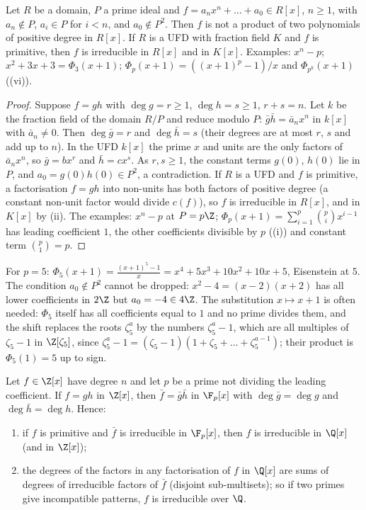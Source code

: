 \begin{theorem}\label{thm:rings:eisenstein}
Let $R$ be a domain, $P$ a prime ideal and $f=a_nx^n+\dots+a_0\in R[x]$, $n\ge1$, with $a_n\notin P$, $a_i\in P$ for $i<n$, and $a_0\notin P^2$. Then $f$ is
not a product of two polynomials of positive degree in $R[x]$. If $R$ is a UFD with fraction field $K$ and $f$ is primitive, then $f$
is irreducible in $R[x]$ and in $K[x]$. Examples: $x^n-p$; $x^2+3x+3=\Phi_3(x+1)$; $\Phi_p(x+1)=((x+1)^p-1)/x$ and $\Phi_{p^k}(x+1)$
((vi)).
\end{theorem}

\begin{proof}
Suppose $f=gh$ with $\deg g=r\ge1$, $\deg h=s\ge1$, $r+s=n$. Let $k$ be the fraction field of the domain $R/P$ and reduce modulo $P$:
$\bar g\bar h=\bar a_nx^n$ in $k[x]$ with $\bar a_n\ne0$. Then $\deg\bar g=r$ and $\deg\bar h=s$ (their degrees are at most $r$, $s$ and add up to $n$). In
the UFD $k[x]$ the prime $x$ and units are the only factors of $\bar a_nx^n$, so $\bar g=bx^r$ and $\bar h=cx^s$. As $r,s\ge1$, the constant terms
$g(0)$, $h(0)$ lie in $P$, and $a_0=g(0)h(0)\in P^2$, a contradiction. If $R$ is a UFD and $f$ is primitive, a factorisation $f=gh$ into non-units
has both factors of positive degree (a constant non-unit factor would divide $c(f)$), so $f$ is irreducible in $R[x]$, and in $K[x]$
by (ii). The examples: $x^n-p$ at $P=p\Z$; $\Phi_p(x+1)=\sum_{i=1}^p\binom pix^{i-1}$ has leading coefficient $1$,
the other coefficients divisible by $p$ ((i)) and constant term $\binom p1=p$.
\end{proof}

For $p=5$: $\Phi_5(x+1)=\frac{(x+1)^5-1}x=x^4+5x^3+10x^2+10x+5$, Eisenstein at $5$. The condition $a_0\notin P^2$ cannot be dropped:
$x^2-4=(x-2)(x+2)$ has all lower coefficients in $2\Z$ but $a_0=-4\in4\Z$. The substitution $x\mapsto x+1$ is often needed: $\Phi_5$ itself
has all coefficients equal to $1$ and no prime divides them, and the shift replaces the roots $\zeta_5^a$ by the numbers $\zeta_5^a-1$, which are all
multiples of $\zeta_5-1$ in $\Z[\zeta_5]$, since $\zeta_5^a-1=(\zeta_5-1)(1+\zeta_5+\dots+\zeta_5^{a-1})$; their product is $\Phi_5(1)=5$ up to sign.

\begin{proposition}\label{prop:rings:reduction-mod-p}
Let $f\in\Z[x]$ have degree $n$ and let $p$ be a prime not dividing the leading coefficient. If $f=gh$ in $\Z[x]$, then $\bar f=\bar g\bar h$ in $\F_p[x]$
with $\deg\bar g=\deg g$ and $\deg\bar h=\deg h$. Hence:
\begin{enumerate}[label=(\roman*)]
\item if $f$ is primitive and $\bar f$ is irreducible in $\F_p[x]$, then $f$ is irreducible in $\Q[x]$ (and in $\Z[x]$);
\item the degrees of the factors in any factorisation of $f$ in $\Q[x]$ are sums of degrees of irreducible factors of $\bar f$
(disjoint sub-multisets); so if two primes give incompatible patterns, $f$ is irreducible over $\Q$.
\end{enumerate}
\end{proposition}

